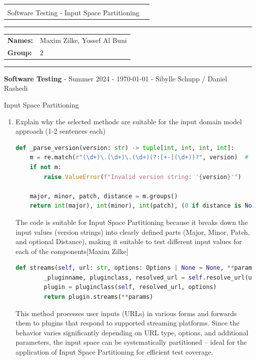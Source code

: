 \documentclass[a4paper]{scrreprt}
\newcommand{\baseinfo}[5]{
  \begin{center}
    \begin{tabular}{p{15cm}r}
      \vspace{-4.5pt}{ \Large \bfseries #1} & \multirow{2}{*}{} \\[0.4cm]
      #2 & \\[0.5cm]
    \end{tabular}
  \end{center}
  \vspace{-18pt}\hrule\vspace{6pt}
  \begin{tabular}{ll}
    \textbf{Names:} & #4\\
    \textbf{Group:} & #5\\
  \end{tabular}
  \vspace{4pt}\hrule\vspace{2pt}
  \footnotesize \textbf{Software Testing} \hfil - \hfil Summer 2024 \hfil - \hfil #3 \hfil - \hfil Sibylle Schupp / Daniel Rashedi \hfil \\
}
\newcounter{question}
\newcommand{\projectinfo}[4]{\baseinfo{Project - Submission Sheet}{#1}{#2}{#3}{#4}}
\newcommand{\name}{Maxim Zilke, Yossef Al Buni}
\newcommand{\group}{2}
\begin{document}
\projectinfo{Software Testing - Input Space Partitioning\small}{\today}{\name}{\group}

\addtocounter{question}{1}


\begin{question}{Input Space Partitioning}
  \begin{enumerate}[topsep=0pt, leftmargin=*]
    \item Explain why the selected methods are suitable for the input domain model approach (1-2 sentences each)
          \begin{answer}
            \begin{lstlisting}[language=Python, caption={Maxim Zilke Function for parsing version strings}]
def _parse_version(version: str) -> tuple[int, int, int, int]:
    m = re.match(r"(\d+)\.(\d+)\.(\d+)(?:[+-](\d+))?", version)  # structure: MAJOR.MINOR.PATCH[+DISTANCE]
    if not m:
        raise ValueError(f"Invalid version string: '{version}'")

    major, minor, patch, distance = m.groups()
    return int(major), int(minor), int(patch), (0 if distance is None else int(distance))
\end{lstlisting}

The code is suitable for Input Space Partitioning because it breaks down the input values (version strings) into clearly defined parts (Major, Minor, Patch, and optional Distance), making it suitable to test different input values for each of the components[Maxim Zilke]

\begin{lstlisting}[language=Python, caption={Yossef Al Buni The funcrion searches for the suitable plugin based on a URL}]
def streams(self, url: str, options: Options | None = None, **params):
        _pluginname, pluginclass, resolved_url = self.resolve_url(url)
        plugin = pluginclass(self, resolved_url, options)
        return plugin.streams(**params)
\end{lstlisting}
This method processes user inputs (URLs) in various forms and forwards them to plugins that respond to supported streaming platforms. Since the behavior varies significantly depending on URL type, options, and additional parameters, the input space can be systematically partitioned – ideal for the application of Input Space Partitioning for efficient test coverage.


\end{answer}
\end{enumerate}
\end{question}
\end{document}
